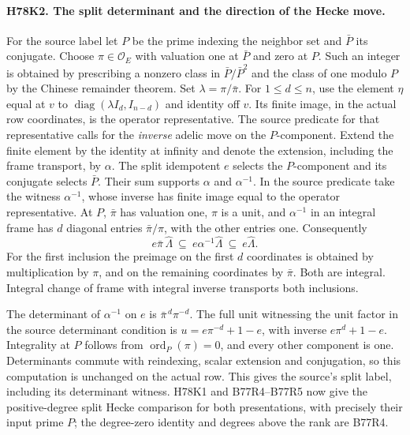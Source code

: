 \paragraph{H78K2. The split determinant and the direction of the Hecke move.}
For the source label let $P$ be the prime indexing the neighbor set
and $\bar P$ its conjugate. Choose $\pi\in\mathcal O_E$ with valuation one at
$\bar P$ and zero at $P$. Such an integer is obtained by prescribing a nonzero class in $\bar P/\bar P^2$ and the class of one modulo $P$ by the Chinese remainder theorem. Set $\lambda=\pi/\bar\pi$.
For $1\leq d\leq n$, use the element $\eta$ equal at $v$ to
$\operatorname{diag}(\lambda I_d,I_{n-d})$ and identity off $v$.
Its finite image, in the actual row coordinates, is the operator
representative. The source predicate for that representative calls
for the \emph{inverse} adelic move on the $P$-component.
Extend the finite element by the identity at infinity and denote the
extension, including the frame transport, by $\alpha$. The split
idempotent $e$ selects the $P$-component and its conjugate selects
$\bar P$. Their sum supports $\alpha$ and $\alpha^{-1}$. In the source predicate take the witness $\alpha^{-1}$, whose inverse has finite image equal to the operator representative.
At $P$, $\bar\pi$ has valuation one, $\pi$ is a unit, and
$\alpha^{-1}$ in an integral frame has $d$ diagonal entries
$\bar\pi/\pi$, with the other entries one. Consequently
\[
  e\bar\pi\,\widehat{\Lambda}
    \ \subseteq\ e\alpha^{-1}\widehat{\Lambda}
    \ \subseteq\ e\widehat{\Lambda}.
\]
For the first inclusion the preimage on the first $d$ coordinates
is obtained by multiplication by $\pi$, and on the remaining
coordinates by $\bar\pi$. Both are integral. Integral change of
frame with integral inverse transports both inclusions.

The determinant of $\alpha^{-1}$ on $e$ is
$\bar\pi^{\,d}\pi^{-d}$. The full unit witnessing the unit factor
in the source determinant condition is
$u=e\pi^{-d}+1-e$, with inverse $e\pi^d+1-e$.
Integrality at $P$ follows from $\operatorname{ord}_P(\pi)=0$,
and every other component is one. Determinants commute with
reindexing, scalar extension and conjugation, so this computation
is unchanged on the actual row. This gives the source's split
label, including its determinant witness. H78K1 and B77R4--B77R5
now give the positive-degree split Hecke comparison for both
presentations, with precisely their input prime $P$; the
degree-zero identity and degrees above the rank are B77R4.

